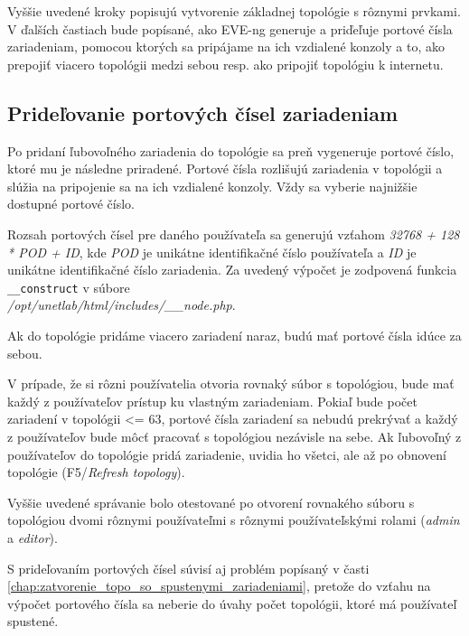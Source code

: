 Vyššie uvedené kroky popisujú vytvorenie základnej topológie s rôznymi prvkami. V ďalších častiach bude popísané, ako EVE-ng generuje a priďeľuje portové čísla zariadeniam, pomocou ktorých sa pripájame na ich vzdialené konzoly a to, ako prepojiť viacero topológii medzi sebou resp. ako pripojiť topológiu k internetu.




\subsection{Prideľovanie portových čísel zariadeniam}
\label{chap:priradovanie_portovych_cisel}

Po pridaní ľubovoľného zariadenia do topológie sa preň vygeneruje portové číslo, ktoré mu je následne priradené. Portové čísla rozlišujú zariadenia v topológii a  slúžia na pripojenie sa na ich vzdialené konzoly. Vždy sa vyberie najnižšie dostupné portové číslo.

Rozsah portových čísel pre daného používateľa sa generujú vzťahom \emph{32768 + 128 * POD + ID}, kde \emph{POD} je unikátne identifikačné číslo používateľa a \emph{ID} je unikátne identifikačné číslo zariadenia. Za uvedený výpočet je zodpovená funkcia \texttt{\_\_construct} v súbore \\ \emph{/opt/unetlab/html/includes/\_\_node.php}.

Ak do topológie pridáme viacero zariadení naraz, budú mať portové čísla idúce za sebou.

V prípade, že si rôzni používatelia otvoria rovnaký súbor s topológiou, bude mať každý z používateľov prístup ku vlastným zariadeniam. Pokiaľ bude počet zariadení v topológii <= 63, portové čísla zariadení sa nebudú prekrývať a každý z používateľov bude môcť pracovať s topológiou nezávisle na sebe. Ak ľubovoľný z používateľov do topológie pridá zariadenie, uvidia ho všetci, ale až po obnovení topológie (F5/\emph{Refresh topology}).

Vyššie uvedené správanie bolo otestované po otvorení rovnakého súboru s topológiou dvomi rôznymi používateľmi s rôznymi používateľskými rolami (\emph{admin} a \emph{editor}).

S prideľovaním portových čísel súvisí aj problém popísaný v časti \ref{chap:zatvorenie_topo_so_spustenymi_zariadeniami}, pretože do vzťahu na výpočet portového čísla sa neberie do úvahy počet topológii, ktoré má používateľ spustené.



